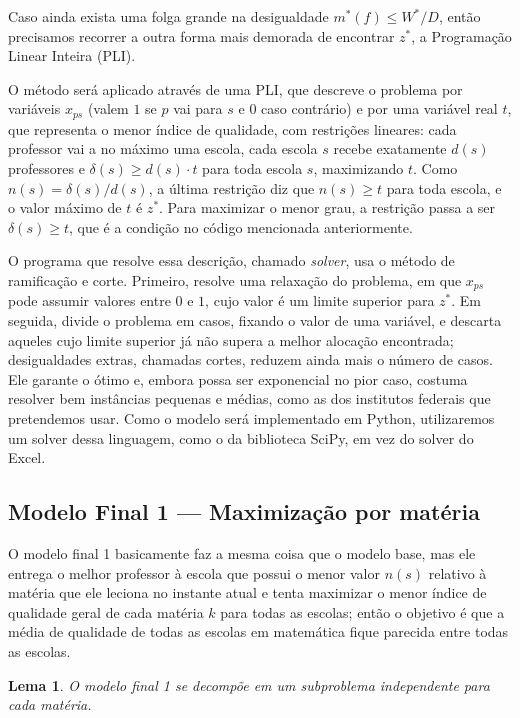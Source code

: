 \documentclass[12pt,a4paper]{article}
\newtheorem{lema}{Lema}
\begin{document}
Caso ainda exista uma folga grande na desigualdade $m^*(f) \le W^*/D$, então precisamos recorrer a outra forma mais demorada de encontrar $z^*$, a Programação Linear Inteira (PLI).

O método será aplicado através de uma PLI, que descreve o problema por variáveis $x_{ps}$ (valem $1$ se $p$ vai para $s$ e $0$ caso contrário) e por uma variável real $t$, que representa o menor índice de qualidade, com restrições lineares: cada professor vai a no máximo uma escola, cada escola $s$ recebe exatamente $d(s)$ professores e $\delta(s) \ge d(s) \cdot t$ para toda escola $s$, maximizando $t$. Como $n(s) = \delta(s)/d(s)$, a última restrição diz que $n(s) \ge t$ para toda escola, e o valor máximo de $t$ é $z^*$. Para maximizar o menor grau, a restrição passa a ser $\delta(s) \ge t$, que é a condição no código mencionada anteriormente.

O programa que resolve essa descrição, chamado \emph{solver}, usa o método de ramificação e corte. Primeiro, resolve uma relaxação do problema, em que $x_{ps}$ pode assumir valores entre $0$ e $1$, cujo valor é um limite superior para $z^*$. Em seguida, divide o problema em casos, fixando o valor de uma variável, e descarta aqueles cujo limite superior já não supera a melhor alocação encontrada; desigualdades extras, chamadas cortes, reduzem ainda mais o número de casos. Ele garante o ótimo e, embora possa ser exponencial no pior caso, costuma resolver bem instâncias pequenas e médias, como as dos institutos federais que pretendemos usar. Como o modelo será implementado em Python, utilizaremos um solver dessa linguagem, como o da biblioteca SciPy, em vez do solver do Excel.

\subsection{Modelo Final 1 --- Maximização por matéria}

O modelo final 1 basicamente faz a mesma coisa que o modelo base, mas ele entrega o melhor professor à escola que possui o menor valor $n(s)$ relativo à matéria que ele leciona no instante atual e tenta maximizar o menor índice de qualidade geral de cada matéria $k$ para todas as escolas; então o objetivo é que a média de qualidade de todas as escolas em matemática fique parecida entre todas as escolas.

\vspace{\baselineskip}

\begin{lema}
O modelo final 1 se decompõe em um subproblema independente para cada matéria.
\end{lema}
\end{document}
